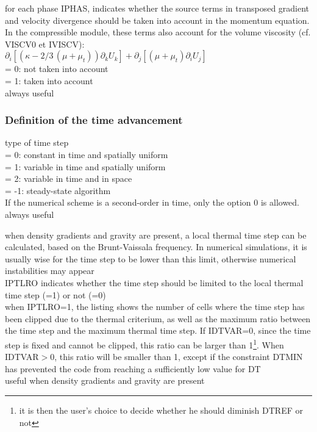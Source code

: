 {for each phase IPHAS, indicates whether the source terms in transposed gradient
and velocity divergence should be taken into account in the momentum
equation. In the compressible module, these terms also account for the volume
viscosity (cf. VISCV0 et IVISCV):\\
$\partial_i \left[(\kappa -2/3\,(\mu+\mu_t))\partial_k U_k  \right]
 +     \partial_j \left[ (\mu+\mu_t)\partial_i U_j \right]$ \\
\hspace*{1.3cm}= 0: not taken into account\\
\hspace*{1.3cm}= 1: taken into account\\
always useful}


\subsubsection{Definition of the time advancement}

{type of time step\\
\hspace*{1.3cm}= 0: constant in time and spatially uniform\\
\hspace*{1.3cm}= 1: variable in time and spatially uniform\\
\hspace*{1.3cm}= 2: variable in time and in space\\
\hspace*{1.3cm}= -1: steady-state algorithm\\
If the numerical scheme is a second-order in time, only the option 0 is
allowed.\\
always useful}

{when density gradients and gravity are present, a local thermal time
step can be calculated, based on the Brunt-Vaissala frequency. In numerical
simulations, it is usually wise for the time step to be lower than this limit,
otherwise numerical instabilities may appear\\
IPTLRO indicates whether the time step should be limited to the local thermal
time step (=1) or not (=0)\\
when IPTLRO=1, the listing shows the number of cells where the time step has
been clipped due to the thermal criterium, as well as the maximum ratio between
the time step and the maximum thermal time step. If IDTVAR=0, since the time
step is fixed and cannot be clipped, this ratio can be larger than
1\footnote{it is then the user's
choice to decide whether he should diminish DTREF or not}. When IDTVAR$>$0, this
ratio will be smaller than 1, except if the constraint DTMIN has prevented the
code from reaching a sufficiently low value for DT\\
useful when density gradients and gravity are present}

